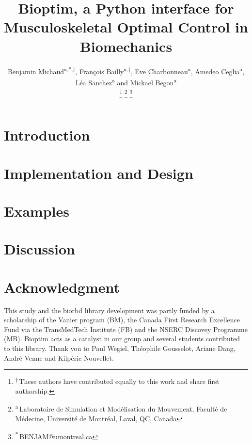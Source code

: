 \documentclass[letterpaper, 10 pt, conference]{ieeeconf}  %
\title{\LARGE \bf Bioptim, a Python interface for Musculoskeletal Optimal Control in Biomechanics}
\author{Benjamin Michaud\textsuperscript{a,*,$\dagger$}, François Bailly\textsuperscript{a,$\dagger$}, Eve Charbonneau\textsuperscript{a}, Amedeo Ceglia\textsuperscript{a}, Léa Sanchez\textsuperscript{a}  and  Mickael Begon\textsuperscript{a}%

\thanks{\textsuperscript{$\dagger$}\,These authors have contributed equally to this work and share first authorship.}
\thanks{\textsuperscript{a}\,Laboratoire de Simulation et Modélisation du Mouvement, Faculté de Médecine, Université de Montréal, Laval, QC, Canada}%
\thanks{\textsuperscript{*}\,BENJAM@umontreal.ca}
}
\begin{document}
\maketitle
\thispagestyle{plain}
\pagestyle{plain}



\section{Introduction}\label{sec:introduction}


\section{Implementation and Design}\label{sec:design&impl}


\section{Examples}\label{sec:Examples}


\section{Discussion}\label{sec:discussion}


\section*{Acknowledgment}
This study and the biorbd library development was partly funded by a scholarship of the  Vanier program (BM), the Canada First Research Excellence Fund via the TransMedTech Institute (FB) and the NSERC Discovey Programme (MB). 
Bioptim acts as a catalyst in our group and several students contributed to this library. 
Thank you to Paul Wegiel, Théophile Gousselot, Ariane Dang, André Venne and Kilpéric Nouvellet. 




\newpage
\label{sec:appendix}
\end{document}
